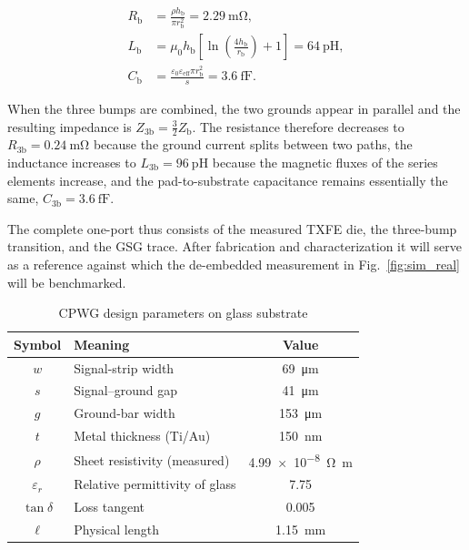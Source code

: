 \documentclass[conference]{IEEEtran}
\begin{document}
\begin{subequations}\label{eq:bumps_single}
\begin{align}
R_{\text{b}}&=\frac{\rho h_{\text{b}}}{\pi r_{\text{b}}^{2}}=\SI{2.29}{\milli\ohm},\\
L_{\text{b}}&=\mu_{0}h_{\text{b}}\!\left[\ln\!\left(\tfrac{4h_{\text{b}}}{r_{\text{b}}}\right)+1\right]=\SI{64}{\pico\henry},\\
C_{\text{b}}&=\frac{\varepsilon_{0}\varepsilon_{\text{eff}}\pi r_{\text{b}}^{2}}{s}
             =\SI{3.6}{\femto\farad}.
\end{align}
\end{subequations}

When the three bumps are combined, the two grounds appear in parallel and the resulting impedance is \(Z_{\text{3b}}=\tfrac{3}{2}Z_{\text{b}}\).  The resistance therefore decreases to \(R_{\text{3b}}=\SI{0.24}{\milli\ohm}\) because the ground current splits between two paths, the inductance increases to \(L_{\text{3b}}=\SI{96}{\pico\henry}\) because the magnetic fluxes of the series elements increase, and the pad-to-substrate capacitance remains essentially the same, \(C_{\text{3b}}=\SI{3.6}{\femto\farad}\).

The complete one-port thus consists of the measured TXFE die, the three-bump transition, and the GSG trace. After fabrication and characterization it will serve as a reference against which the de-embedded measurement in Fig.~\ref{fig:sim_real} will be benchmarked.


\begin{table}[htbp]
\vspace{-8px}
  \caption{CPWG design parameters on glass substrate}
  \label{tab:cpwg_params}
  \centering
  \begin{tabular}{|c|l|c|}
    \hline
    \textbf{Symbol} & \textbf{Meaning} & \textbf{Value} \\ \hline
    $w$              & Signal-strip width                 & \SI{69}{\micro\metre} \\ \hline
    $s$              & Signal–ground gap                  & \SI{41}{\micro\metre} \\ \hline
    $g$              & Ground-bar width                   & \SI{153}{\micro\metre} \\ \hline
    $t$              & Metal thickness (Ti/Au)            & \SI{150}{\nano\metre} \\ \hline
    $\rho$           & Sheet resistivity (measured)       & \SI{4.99e-8}{\ohm\metre} \\ \hline
    $\varepsilon_r$  & Relative permittivity of glass     & 7.75 \\ \hline
    $\tan\delta$     & Loss tangent                       & 0.005 \\ \hline
    $\ell$           & Physical length                    & \SI{1.15}{\milli\metre} \\ \hline
  \end{tabular}
\end{table}
\end{document}
